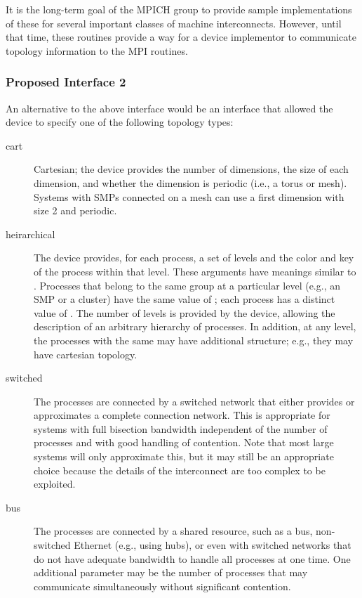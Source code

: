 \documentclass{article}
\begin{document}
It is the long-term goal of the MPICH group to provide sample implementations
of these for several important classes of machine interconnects.  However,
until that time, these routines provide a way for a device implementor to
communicate topology information to the MPI routines. 

\subsubsection{Proposed Interface 2}
An alternative to the above interface would be an interface that allowed
the device to specify one of the following topology types:
\begin{description}
\item[cart]Cartesian; the device provides the number of dimensions, the size 
of each dimension, and whether the dimension is periodic (i.e., a
torus or mesh).  Systems with SMPs connected on a mesh can use a first
dimension with size 2 and periodic.
\item[heirarchical]The device provides, for each process, a set of
  levels and the color and key of the process within that level.
  These arguments have meanings similar to .
  Processes that belong to the same group at a particular level (e.g.,
  an SMP or a cluster) have the same value of ; each
  process has a distinct value of .  The number of levels is
  provided by the device, allowing the description of an arbitrary
  hierarchy of processes.  In addition, at any level, the processes
  with the same  may have additional structure; e.g., they
  may have cartesian topology.
\item[switched]The processes are connected by a switched network that
  either provides or approximates a complete connection network.  This
  is appropriate for systems with full bisection bandwidth independent
  of the number of processes and with good handling of contention.
  Note that most large systems will only approximate this, but it may
  still be an appropriate choice because the details of the
  interconnect are too complex to be exploited.
\item[bus]The processes are connected by a shared resource, such as a
  bus, non-switched Ethernet (e.g., using hubs), or even with switched
  networks that do not have adequate bandwidth to handle all processes
  at one time.  One additional parameter may be the number of
  processes that may communicate simultaneously without significant
  contention.
\end{description}
\end{document}
